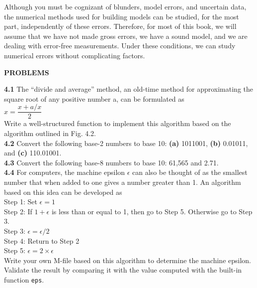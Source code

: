 \documentclass[../main.tex]{subfiles}
\begin{document}
Although you must be cognizant of blunders, model errors, and uncertain data, the numerical
methods used for building models can be studied, for the most part, independently
of these errors. Therefore, for most of this book, we will assume that we have not made gross
errors, we have a sound model, and we are dealing with error-free measurements. Under
these conditions, we can study numerical errors without complicating factors.\\
\bigskip

\noindent\textbf{PROBLEMS}\\

\begin{multicols}{2}
    \noindent\textbf{4.1} The ``divide and average'' method, an old-time method
    for approximating the square root of any positive number a,
    can be formulated as\\

    $x = \dfrac{x+a/x}{2}$\\

    \noindent
    Write a well-structured function to implement this algorithm
    based on the algorithm outlined in Fig. 4.2.\\

    \noindent\textbf{4.2} Convert the following base-2 numbers to base 10:
    \textbf{(a)} 1011001, \textbf{(b)} 0.01011, and \textbf{(c)} 110.01001.\\

    \noindent\textbf{4.3} Convert the following base-8 numbers to base 10:
    61,565 and 2.71.\\

    \noindent\textbf{4.4} For computers, the machine epsilon $\epsilon$ can also be
    thought of as the smallest number that when added to one
    gives a number greater than 1. An algorithm based on this
    idea can be developed as\\
    Step 1: Set $\epsilon = 1$\\
    Step 2: If $1 + \epsilon$ is less than or equal to 1, then go to Step 5.
    Otherwise go to Step 3.\\
    Step 3: $\epsilon = \epsilon/2$\\
    Step 4: Return to Step 2\\
    Step 5: $\epsilon = 2 \times \epsilon$\\

    \noindent Write your own M-file based on this algorithm to determine
    the machine epsilon. Validate the result by comparing it with
    the value computed with the built-in function \texttt{eps}.\\


\end{multicols}
\end{document}
